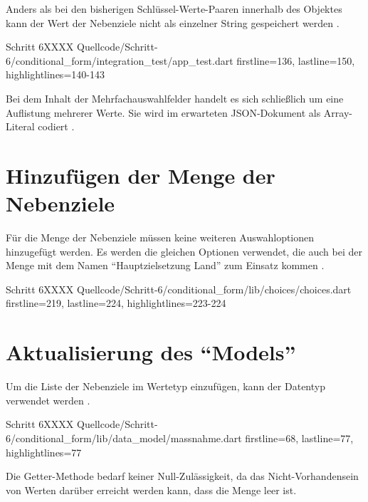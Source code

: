 Anders als bei den bisherigen Schlüssel-Werte-Paaren innerhalb des Objektes  kann der Wert der Nebenziele nicht als einzelner String gespeichert werden \Lst{\ref{lst:Schritt6expectedJson}}.

\begin{alexlisting}{Schritt 6}{XXXX}
  {Quellcode/Schritt-6/conditional_form/integration_test/app_test.dart}
  {firstline=136, lastline=150, highlightlines={140-143}}
  \label{lst:Schritt6expectedJson}
\end{alexlisting}

Bei dem Inhalt der Mehrfachauswahlfelder handelt es sich schließlich um eine Auflistung mehrerer Werte.
Sie wird im erwarteten JSON-Dokument als Array-Literal codiert .



\section{Hinzufügen der Menge der Nebenziele}

Für die Menge der Nebenziele müssen keine weiteren Auswahloptionen hinzugefügt werden.
Es werden die gleichen Optionen verwendet,
die auch bei der Menge  mit dem Namen \enquote{Hauptzielsetzung Land} zum Einsatz kommen .

\begin{alexlisting}{Schritt 6}{XXXX}
  {Quellcode/Schritt-6/conditional_form/lib/choices/choices.dart}
  {firstline=219, lastline=224, highlightlines={223-224}}
  \label{lst:Schritt6nebenzielsetzungLandChoices}
\end{alexlisting}

\section{Aktualisierung des \enquote{Models}}

Um die Liste der Nebenziele im Wertetyp  einzufügen,
kann der Datentyp  verwendet werden .
\begin{alexlisting}{Schritt 6}{XXXX}
  {Quellcode/Schritt-6/conditional_form/lib/data_model/massnahme.dart}
  {firstline=68, lastline=77, highlightlines={77}}
  \label{lst:Schritt6MassnahmenCharakteristika}
\end{alexlisting}
Die Getter-Methode  bedarf keiner Null-Zulässigkeit,
da das Nicht-Vorhandensein von Werten darüber erreicht werden kann,
dass die Menge leer ist.




